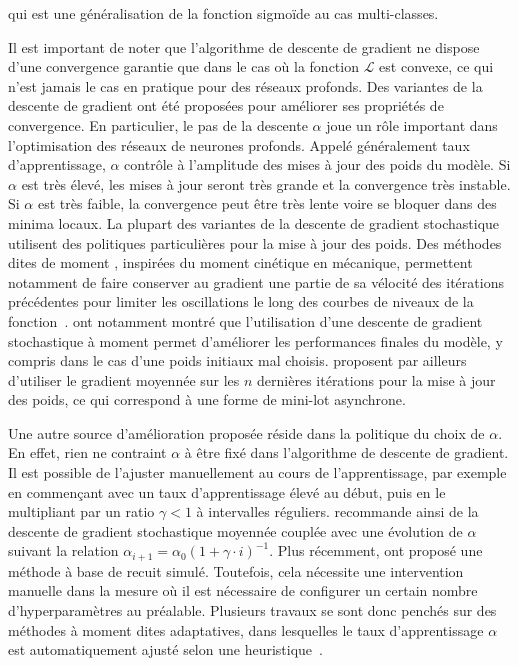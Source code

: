qui est une généralisation de la fonction sigmoïde au cas multi-classes.

Il est important de noter que l'algorithme de descente de gradient ne dispose d'une convergence garantie que dans le cas où la fonction $\mathcal{L}$ est convexe, ce qui n'est jamais le cas en pratique pour des réseaux profonds. Des variantes de la descente de gradient ont été proposées pour améliorer ses propriétés de convergence. En particulier, le pas de la descente $\alpha$ joue un rôle important dans l'optimisation des réseaux de neurones profonds. Appelé généralement taux d'apprentissage, $\alpha$ contrôle à l'amplitude des mises à jour des poids du modèle. Si $\alpha$ est très élevé, les mises à jour seront très grande et la convergence très instable. Si $\alpha$ est très faible, la convergence peut être très lente voire se bloquer dans des minima locaux. La plupart des variantes de la descente de gradient stochastique utilisent des politiques particulières pour la mise à jour des poids. Des méthodes dites de \og moment \fg, inspirées du moment cinétique en mécanique, permettent notamment de faire conserver au gradient une partie de sa vélocité des itérations précédentes pour limiter les oscillations le long des courbes de niveaux de la fonction~\cite{qian_momentum_1999,nesterov_method_1983}. \citet{sutskever_importance_2013-1} ont notamment montré que l'utilisation d'une descente de gradient stochastique à moment permet d'améliorer les performances finales du modèle, y compris dans le cas d'une poids initiaux mal choisis. \citet{polyak_acceleration_1992} proposent par ailleurs d'utiliser le gradient moyennée sur les $n$ dernières itérations pour la mise à jour des poids, ce qui correspond à une forme de mini-lot asynchrone.

Une autre source d'amélioration proposée réside dans la politique du choix de $\alpha$. En effet, rien ne contraint $\alpha$ à être fixé dans l'algorithme de descente de gradient. Il est possible de l'ajuster manuellement au cours de l'apprentissage, par exemple en commençant avec un taux d'apprentissage élevé au début, puis en le multipliant par un ratio $\gamma < 1$ à intervalles réguliers. \citet{bottou_stochastic_2012} recommande ainsi de la descente de gradient stochastique moyennée couplée avec une évolution de $\alpha$ suivant la relation $\alpha_{i+1} = \alpha_0 (1 + \gamma \cdot i)^{-1}$. Plus récemment, \citet{loshchilov_sgdr_2016} ont proposé une méthode à base de recuit simulé. Toutefois, cela nécessite une intervention manuelle dans la mesure où il est nécessaire de configurer un certain nombre d'hyperparamètres au préalable. Plusieurs travaux se sont donc penchés sur des méthodes à moment dites adaptatives, dans lesquelles le taux d'apprentissage $\alpha$ est automatiquement ajusté selon une heuristique~\cite{duchi_adaptive_2011,tielman_lecture_2012,zeiler_adadelta_2012,kingma_adam_2014}.

